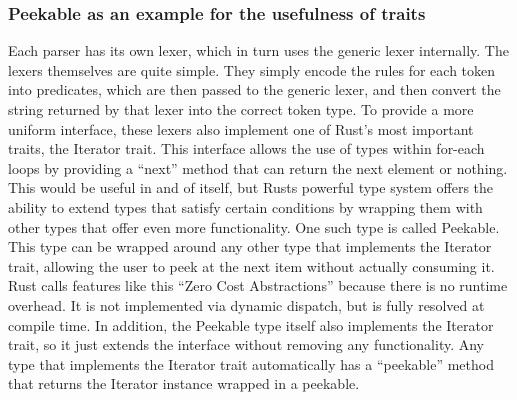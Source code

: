 \subsubsection{Peekable as an example for the usefulness of traits}
Each parser has its own lexer, which in turn uses the generic lexer internally.
The lexers themselves are quite simple. They simply encode the rules for each token into predicates, which are then passed to the generic lexer, and then convert the string returned by that lexer into the correct token type.
To provide a more uniform interface, these lexers also implement one of Rust's most important traits, the Iterator trait.
This interface allows the use of types within for-each loops by providing a ``next'' method that can return the next element or nothing.
This would be useful in and of itself, but Rusts powerful type system offers the ability to extend types that satisfy certain conditions by wrapping them with other types that offer even more functionality.
One such type is called Peekable. This type can be wrapped around any other type that implements the Iterator trait, allowing the user to peek at the next item without actually consuming it.
Rust calls features like this ``Zero Cost Abstractions'' because there is no runtime overhead. It is not implemented via dynamic dispatch, but is fully resolved at compile time.
In addition, the Peekable type itself also implements the Iterator trait, so it just extends the interface without removing any functionality.
Any type that implements the Iterator trait automatically has a ``peekable'' method that returns the Iterator instance wrapped in a peekable.

